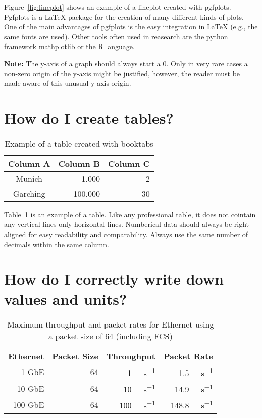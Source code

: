 Figure~\ref{fig:lineplot} shows an example of a lineplot created with pgfplots.
Pgfplots is a \LaTeX{} package for the creation of many different kinds of plots.
One of the main advantages of pgfplots is the easy integration in \LaTeX{} (e.g., the same fonts are used).
Other tools often used in reasearch are the python framework mathplotlib or the R language.

\textbf{Note:} The y-axis of a graph should always start a 0.
Only in very rare cases a non-zero origin of the y-axis might be justified, however, the reader must be made aware of this unusual y-axis origin.

\section{How do I create tables?}
\label{sec:tables}

\begin{table}
	\centering
	\begin{tabular}{c r r}
		\toprule
		Column A & Column B & Column C \\
		\midrule
		Munich   &    1.000 &        2 \\
		Garching &  100.000 &       30 \\
		\bottomrule
	\end{tabular}
	\caption{Example of a table created with booktabs}
	\label{tab:tabular}
\end{table}

Table~\ref{tab:tabular} is an example of a table.
Like any professional table, it does not cointain any vertical lines only horizontal lines.
Numberical data should always be right-aligned for easy readability and comparability.
Always use the same number of decimals within the same column.

\pagebreak

\section{How do I correctly write down values and units?}
\label{sec:siunitx}


\begin{table}
        \centering
        \begin{tabular}{r r r r}
                \toprule
		Ethernet &    Packet Size &                     Throughput &                         Packet Rate \\
                \midrule
		1 GbE    & \SI{64}{\byte} &   \SI{1}{\giga\bit\per\second} &   \SI{1.5}{\mega\packet\per\second} \\
		10 GbE   & \SI{64}{\byte} &  \SI{10}{\giga\bit\per\second} &  \SI{14.9}{\mega\packet\per\second} \\
		100 GbE  & \SI{64}{\byte} & \SI{100}{\giga\bit\per\second} & \SI{148.8}{\mega\packet\per\second} \\
                \bottomrule
        \end{tabular}
	\caption{Maximum throughput and packet rates for Ethernet using a packet size of \SI{64}{\byte} (including FCS)}
        \label{tab:units}
\end{table}

